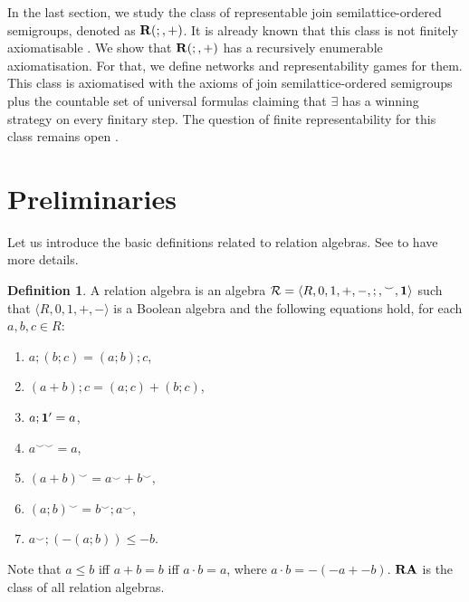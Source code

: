 \documentclass[a4paper]{article}
\theoremstyle{definition}
\newtheorem{definition}{Definition}
\theoremstyle{theorem}
\theoremstyle{proposition}
\theoremstyle{lemma}
\theoremstyle{ex}
\theoremstyle{corollary}
\theoremstyle{claim}
\begin{document}
In the last section, we study the class of representable join semilattice-ordered semigroups, denoted as ${\bf R}(;,+)$. It is
already known that this class is not finitely axiomatisable \cite{andreka2011axiomatizability}.
We show that ${\bf R}(;,+)$ has a recursively enumerable axiomatisation. For that,
we define networks and representability games for them. This class is axiomatised with the axioms of join semilattice-ordered semigroups plus the countable set of universal formulas claiming that
$\exists$ has a winning strategy on every finitary step. The question of finite representability for this class remains open \cite{vsemrl2021domain}.

\section{Preliminaries}

Let us introduce the basic definitions related to relation algebras. See \cite[Section 3]{hirsch2002relation} to have more details.
\begin{definition} A relation algebra is an algebra $\mathcal{R} = \langle R, 0, 1, +, -, ;, {}^{\smile}, {\bf 1 }\rangle$ such that $\langle R, 0, 1, +, - \rangle$ is a Boolean algebra and the following equations hold, for each $a, b, c \in R$:
    \begin{enumerate}
      \item $a ; (b ; c) = (a ; b) ; c$,
      \item $(a + b) ; c = (a ; c) + (b ; c)$,
      \item $a ; {\bf 1}' = a$,
      \item $a^{\smile \smile} = a$,
      \item $(a + b)^{\smile} = a^{\smile} + b^{\smile}$,
      \item $(a ; b)^{\smile} = b^{\smile} ; a^{\smile}$,
      \item $a^{\smile} ; (- (a ; b)) \leq - b$.
    \end{enumerate}
Note that $a \leq b$ iff $a + b = b$ iff $a \cdot b = a$, where $a \cdot b = - (- a + - b)$. ${\bf RA}$ is the class of all relation algebras.
\end{definition}
\end{document}
